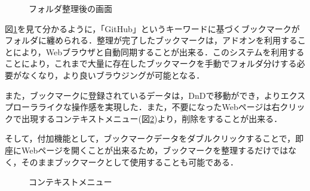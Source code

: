 \documentclass[a4paper,10pt,fleqn]{jsarticle}
\begin{document}
\begin{figure}[h]
  \begin{center}
    \caption{フォルダ整理後の画面}
    \label{fig:prot3}
  \end{center}
\end{figure}

\newpage

図\ref{fig:prot3}を見て分かるように，「GitHub」というキーワードに基づくブックマークがフォルダに纏められる．整理が完了したブックマークは，アドオンを利用することにより，Webブラウザと自動同期することが出来る．このシステムを利用することにより，これまで大量に存在したブックマークを手動でフォルダ分けする必要がなくなり，より良いブラウジングが可能となる．

また，ブックマークに登録されているデータは，DnDで移動ができ，よりエクスプローラライクな操作感を実現した．また，不要になったWebページは右クリックで出現するコンテキストメニュー(図\ref{fig:prot4})より，削除をすることが出来る．

そして，付加機能として，ブックマークデータをダブルクリックすることで，即座にWebページを開くことが出来るため，ブックマークを整理するだけではなく，そのままブックマークとして使用することも可能である．

\begin{figure}[h]
  \begin{center}
    \caption{コンテキストメニュー}
    \label{fig:prot4}
  \end{center}
\end{figure}
\end{document}

